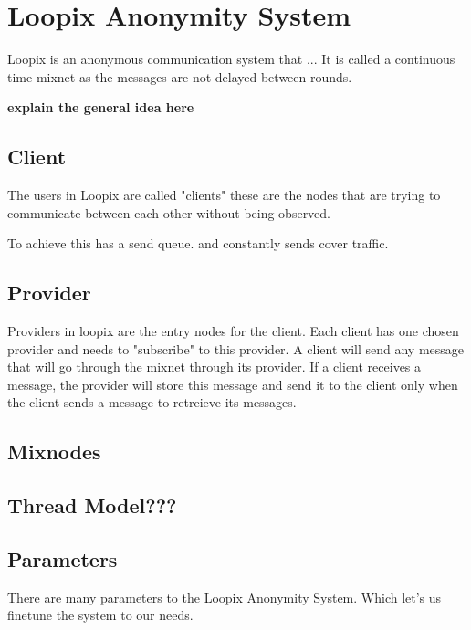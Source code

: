 \documentclass[a4paper,11pt,oneside]{report}
\begin{document}
\section{Loopix Anonymity System}
Loopix is an anonymous communication system that ... It is called a continuous time mixnet as the messages are not delayed between rounds.

\textbf{explain the general idea here}
\subsection{Client}
The users in Loopix are called "clients" these are the nodes that are trying to communicate between each other without being observed.

To achieve this has a send queue. and constantly sends cover traffic.
\subsection{Provider}

Providers in loopix are the entry nodes for the client. Each client has one chosen provider and needs to "subscribe" to this provider. A client will send any message that will go through the mixnet through its provider. If a client receives a message, the provider will store this message and send it to the client only when the client sends a message to retreieve its messages.
\subsection{Mixnodes}

\subsection{Thread Model???}

\subsection{Parameters}
There are many parameters to the Loopix Anonymity System. Which let's us finetune the system to our needs.
\end{document}
